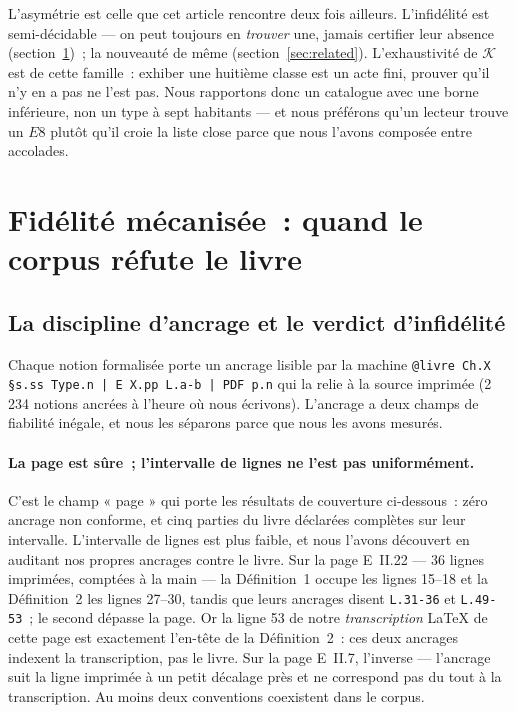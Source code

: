 \documentclass[11pt]{article}
\theoremstyle{remark}\newtheorem{example}{Exemple}
\begin{document}
L'asymétrie est celle que cet article rencontre deux fois ailleurs. L'infidélité est
semi-décidable --- on peut toujours en \emph{trouver} une, jamais certifier leur absence
(section~\ref{sec:fidelity})~; la nouveauté de même (section~\ref{sec:related}).
L'exhaustivité de $\mathcal{K}$ est de cette famille~: exhiber une huitième classe est un
acte fini, prouver qu'il n'y en a pas ne l'est pas. Nous rapportons donc un catalogue
avec une borne inférieure, non un type à sept habitants --- et nous préférons qu'un
lecteur trouve un $E8$ plutôt qu'il croie la liste close parce que nous l'avons composée
entre accolades.

\section{Fidélité mécanisée~: quand le corpus réfute le livre}
\label{sec:fidelity}
\subsection{La discipline d'ancrage et le verdict d'infidélité}
Chaque notion formalisée porte un ancrage lisible par la machine
\texttt{@livre Ch.X \S{}s.ss Type.n | E X.pp L.a-b | PDF p.n} qui la relie à la source
imprimée (2\,234 notions ancrées à l'heure où nous écrivons). L'ancrage a deux champs de
fiabilité inégale, et nous les séparons parce que nous les avons mesurés.

\paragraph{La page est sûre~; l'intervalle de lignes ne l'est pas uniformément.} C'est le
champ « page » qui porte les résultats de couverture ci-dessous~: zéro ancrage non
conforme, et cinq parties du livre déclarées complètes sur leur intervalle. L'intervalle
de lignes est plus faible, et nous l'avons découvert en auditant nos propres ancrages
contre le livre. Sur la page E~II.22 --- 36 lignes imprimées, comptées à la main --- la
Définition~1 occupe les lignes 15--18 et la Définition~2 les lignes 27--30, tandis que
leurs ancrages disent \texttt{L.31-36} et \texttt{L.49-53}~; le second dépasse la page.
Or la ligne 53 de notre \emph{transcription} \LaTeX{} de cette page est exactement
l'en-tête de la Définition~2~: ces deux ancrages indexent la transcription, pas le livre.
Sur la page E~II.7, l'inverse --- l'ancrage suit la ligne imprimée à un petit décalage
près et ne correspond pas du tout à la transcription. Au moins deux conventions coexistent
dans le corpus.
\end{document}
